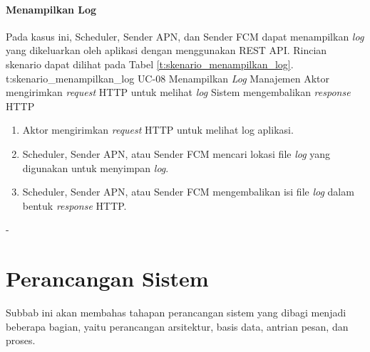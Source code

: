\paragraph{Menampilkan Log}
\par Pada kasus ini, Scheduler, Sender APN, dan Sender FCM dapat menampilkan \textit{log} yang dikeluarkan oleh aplikasi dengan menggunakan REST API. Rincian skenario dapat dilihat pada Tabel \ref{t:skenario_menampilkan_log}.
\tableUcDesc
{t:skenario_menampilkan_log}
{UC-08}
{Menampilkan \textit{Log}}
{Manajemen}
{Aktor mengirimkan \textit{request} HTTP untuk melihat \textit{log}}
{Sistem mengembalikan \textit{response} HTTP}
{
\begin{enumerate}
	\item Aktor mengirimkan \textit{request} HTTP untuk melihat log aplikasi.
	\item Scheduler, Sender APN, atau Sender FCM mencari lokasi file \textit{log} yang digunakan untuk menyimpan \textit{log}.
	\item Scheduler, Sender APN, atau Sender FCM mengembalikan isi file \textit{log} dalam bentuk \textit{response} HTTP.
\end{enumerate}
}
{-}

\section{Perancangan Sistem}
\par Subbab ini akan membahas tahapan perancangan sistem yang dibagi menjadi beberapa bagian, yaitu perancangan arsitektur, basis data, antrian pesan, dan proses.

